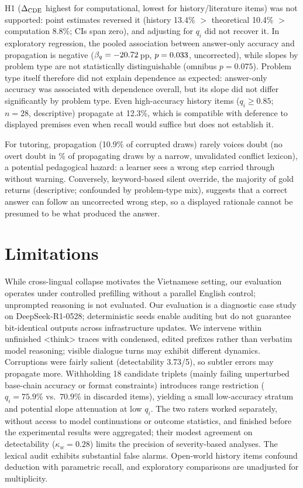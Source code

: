 H1 ($\Delta_{\mathrm{CDE}}$ highest for computational, lowest for history/literature items) was not supported: point estimates reversed it (history 13.4\% $>$ theoretical 10.4\% $>$ computation 8.8\%; CIs span zero), and adjusting for $q_i$ did not recover it. In exploratory regression, the pooled association between answer-only accuracy and propagation is negative ($\beta_q = -20.72$\,pp, $p = 0.033$, uncorrected), while slopes by problem type are not statistically distinguishable (omnibus $p = 0.075$). Problem type itself therefore did not explain dependence as expected: answer-only accuracy was associated with dependence overall, but its slope did not differ significantly by problem type. Even high-accuracy history items ($q_i \ge 0.85$; $n=28$, descriptive) propagate at 12.3\%, which is compatible with deference to displayed premises even when recall would suffice but does not establish it.

For tutoring, propagation (10.9\% of corrupted draws) rarely voices doubt (no overt doubt in \PropRationalizationPct\% of propagating draws by a narrow, unvalidated conflict lexicon), a potential pedagogical hazard: a learner sees a wrong step carried through without warning. Conversely, keyword-based silent override, the majority of gold returns (descriptive; confounded by problem-type mix), suggests that a correct answer can follow an uncorrected wrong step, so a displayed rationale cannot be presumed to be what produced the answer.

\section{Limitations}
\label{sec:limitations}

While cross-lingual collapse motivates the Vietnamese setting, our evaluation operates under controlled prefilling without a parallel English control; unprompted reasoning is not evaluated. Our evaluation is a diagnostic case study on DeepSeek-R1-0528; deterministic seeds enable auditing but do not guarantee bit-identical outputs across infrastructure updates. We intervene within unfinished \textnormal{\textless{}think\textgreater{}} traces with condensed, edited prefixes rather than verbatim model reasoning; visible dialogue turns may exhibit different dynamics. Corruptions were fairly salient (detectability 3.73/5), so subtler errors may propagate more. Withholding 18 candidate triplets (mainly failing unperturbed base-chain accuracy or format constraints) introduces range restriction ($q_i = 75.9\%$ vs.\ $70.9\%$ in discarded items), yielding a small low-accuracy stratum and potential slope attenuation at low $q_i$. The two raters worked separately, without access to model continuations or outcome statistics, and finished before the experimental results were aggregated; their modest agreement on detectability ($\kappa_w = 0.28$) limits the precision of severity-based analyses. The lexical audit exhibits substantial false alarms. Open-world history items confound deduction with parametric recall, and exploratory comparisons are unadjusted for multiplicity.

